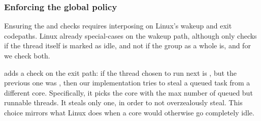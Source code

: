 \subsubsection{Enforcing the global policy}\label{ss:implementation:exit}

Ensuring the \entry{} and \exit{} checks requires interposing on Linux's wakeup
and exit codepaths. Linux already special-cases on the wakeup path, although
only checks if the thread itself is marked as idle, and not if the group as a
whole is, and for \schedbe{} we check both.

\schedbe{} adds a check on the exit path: if the thread chosen to run next is
\schedbe{}, but the previous one was \schednormal{}, then our implementation
tries to steal a queued \schednormal{} task from a different core. Specifically,
it picks the core with the max number of queued but runnable \schednormal{}
threads. It steals only one, in order to not overzealously steal. This choice
mirrors what Linux does when a core would otherwise go completely idle.